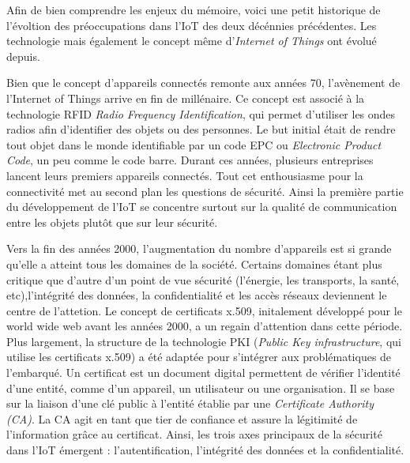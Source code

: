 \vspace{0.1cm}

Afin de bien comprendre les enjeux du mémoire, voici une petit historique de l'évoltion des préoccupations dans l'IoT des deux décénnies précédentes. Les technologie mais également le concept même d'\textit{Internet of Things} ont évolué depuis.

\vspace{0.1cm}

Bien que le concept d'appareils connectés remonte aux années 70, l'avène\-ment de l'Internet of Things arrive en fin de millénaire. Ce concept est associé à la technologie RFID \textit{Radio Frequency Identification}\cite{RFID}, qui permet d'utiliser les ondes radios afin d'identifier des objets ou des personnes. Le but initial était de rendre tout objet dans le monde identifiable par un code EPC ou \textit{Electronic Product Code}\cite{EPC}, un peu comme le code barre. Durant ces années, plusieurs entreprises lancent leurs premiers appareils connectés. Tout cet enthousiasme pour la connectivité met au second plan les questions de sécurité. Ainsi la première partie du développement de l'IoT se concentre surtout sur la qualité de communication entre les objets plutôt que sur leur sécurité.

\vspace{0.1cm}

Vers la fin des années 2000, l'augmentation du nombre d'appareils est si grande qu'elle a atteint tous les domaines de la société. Certains domaines étant plus critique que d'autre d'un point de vue sécurité (l'énergie, les transports, la santé, etc),l'intégrité des données, la confidentialité et les accès réseaux deviennent le centre de l'attetion. 
Le concept de certificats x.509, initalement dévelop\-pé pour le world wide web avant les années 2000, a un regain d'attention dans cette période. Plus largement, la structure de la technologie PKI (\textit{Public Key infrastructure}, qui utilise les certificats x.509)\cite{PKI} a été adaptée pour s'intégrer aux problématiques de l'embarqué. Un certificat est un document digital permettent de vérifier l'identité d'une entité, comme d'un appareil, un utilisateur ou une organisation. Il se base sur la liaison d'une clé public à l'entité établie par une \textit{Certificate Authority (CA)}. La CA agit en tant que tier de confiance et assure la légitimité de l'information grâce au certificat. Ainsi, les trois axes principaux de la sécurité dans l'IoT émergent : l'autentification, l'intégrité des données et la confidentialité.


